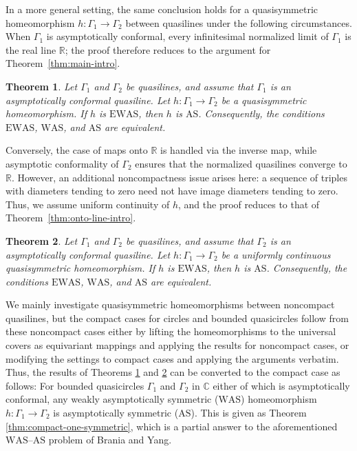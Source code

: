 \documentclass[11pt]{amsart}
\numberwithin{equation}{section}
\newtheorem{theorem}{Theorem}[section]
\theoremstyle{definition} %
\theoremstyle{remarkstyle}
\newcommand{\R}{\mathbb{R}}
\newcommand{\C}{\mathbb{C}}
\begin{document}
In a more general setting, the same conclusion holds for a quasisymmetric homeomorphism $h\colon\Gamma_1 \to \Gamma_2$ between quasilines under the following circumstances. 
When $\Gamma_1$ is asymptotically conformal, every infinitesimal normalized limit of $\Gamma_1$ is the real line $\R$; the proof therefore reduces to the argument for Theorem~\ref{thm:main-intro}.

\begin{theorem}\label{thm:symmetric-source-intro}
Let $\Gamma_1$ and $\Gamma_2$ be quasilines, and assume that $\Gamma_1$ is an asymptotically conformal quasiline.  
Let $h\colon\Gamma_1\to\Gamma_2$ be a quasisymmetric homeomorphism. 
If $h$ is $\mathrm{EWAS}$, then $h$ is $\mathrm{AS}$.
Consequently, the conditions $\mathrm{EWAS}$, $\mathrm{WAS}$, and $\mathrm{AS}$ are equivalent.
\end{theorem}

Conversely, the case of maps onto $\mathbb{R}$ is handled via the inverse map, while asymptotic conformality of $\Gamma_2$ ensures that the normalized quasilines converge to $\mathbb{R}$.
However, an additional noncompactness issue arises here: a sequence of triples with diameters tending to zero need not have image diameters tending to zero. 
Thus, we assume uniform continuity of $h$, and the proof reduces to that of Theorem~\ref{thm:onto-line-intro}. 

\begin{theorem}\label{thm:symmetric-target-intro}
Let $\Gamma_1$ and $\Gamma_2$ be quasilines, and assume that $\Gamma_2$ is an
asymptotically conformal quasiline.  
Let $h\colon\Gamma_1\to\Gamma_2$ be a uniformly continuous quasisymmetric homeomorphism.  
If $h$ is $\mathrm{EWAS}$, then $h$ is $\mathrm{AS}$.
Consequently, the conditions $\mathrm{EWAS}$, $\mathrm{WAS}$, and $\mathrm{AS}$ are equivalent.
\end{theorem}

We mainly investigate quasisymmetric homeomorphisms between noncompact quasilines, but the compact cases for circles and bounded quasicircles follow from these noncompact cases either by lifting the homeomorphisms to the universal covers as equivariant mappings and applying the results for noncompact cases, or modifying the settings to compact cases and applying the arguments verbatim.
Thus, the results of Theorems \ref{thm:symmetric-source-intro} and \ref{thm:symmetric-target-intro} can be converted to the compact case as follows:
For bounded quasicircles $\Gamma_1$ and $\Gamma_2$ in $\C$ either of which is asymptotically conformal, any weakly asymptotically symmetric ($\mathrm{WAS}$) homeomorphism
$h\colon\Gamma_1\longrightarrow\Gamma_2$ is asymptotically symmetric ($\mathrm{AS}$).
This is given as Theorem \ref{thm:compact-one-symmetric}, which
is a partial answer to the aforementioned $\mathrm{WAS}$--$\mathrm{AS}$ problem of Brania and Yang.
\end{document}
